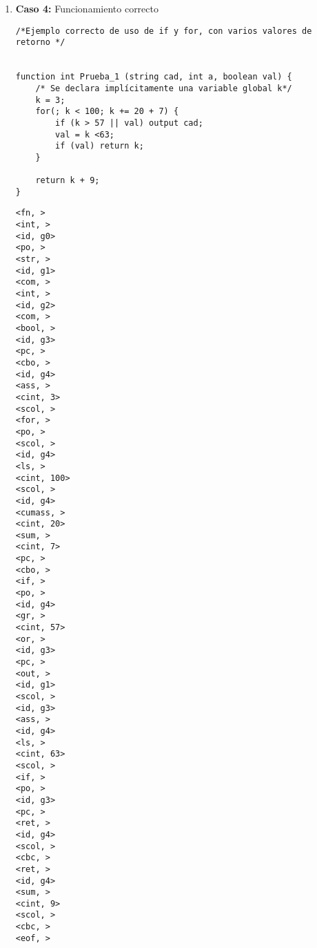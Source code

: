 \begin{enumerate}
\begin{tcolorbox}[title={Árbol sintáctico}, colback=white, breakable]
\begin{lstlisting}
                                              · COMPOP (45)
                                                · >
                                              · EXP4 (47)
                                                · EXPATOM (52)
                                                  · id
                                                  · IDVAL (59)
                                                    · lambda
                                                · ARITH (49)
                                                  · lambda
                                              · COMP (44)
                                                · lambda
                                          · EXPAND (41)
                                            · lambda
                                      · EXPOR (38)
                                        · lambda
                                    · )
                                  · ARITH (49)
                                    · lambda
                                · COMP (44)
                                  · lambda
                              · EXPAND (41)
                                · lambda
                            · EXPOR (38)
                              · lambda
                    · ;
                · P (3)
                  · eof
        \end{lstlisting}
    \end{tcolorbox}





    \item \textbf{Caso 4:} Funcionamiento correcto
    \begin{tcolorbox}[title={Código fuente}, colback=white]
        \begin{lstlisting}
/*Ejemplo correcto de uso de if y for, con varios valores de retorno */


function int Prueba_1 (string cad, int a, boolean val) {
	/* Se declara implícitamente una variable global k*/
	k = 3;
	for(; k < 100; k += 20 + 7) {
		if (k > 57 || val) output cad;
		val = k <63;
		if (val) return k;
	}

	return k + 9;
}
        \end{lstlisting}
    \end{tcolorbox}

    \begin{tcolorbox}[title={Volcado del fichero de tokens}, colback=white]
        \begin{lstlisting}
<fn, >
<int, >
<id, g0>
<po, >
<str, >
<id, g1>
<com, >
<int, >
<id, g2>
<com, >
<bool, >
<id, g3>
<pc, >
<cbo, >
<id, g4>
<ass, >
<cint, 3>
<scol, >
<for, >
<po, >
<scol, >
<id, g4>
<ls, >
<cint, 100>
<scol, >
<id, g4>
<cumass, >
<cint, 20>
<sum, >
<cint, 7>
<pc, >
<cbo, >
<if, >
<po, >
<id, g4>
<gr, >
<cint, 57>
<or, >
<id, g3>
<pc, >
<out, >
<id, g1>
<scol, >
<id, g3>
<ass, >
<id, g4>
<ls, >
<cint, 63>
<scol, >
<if, >
<po, >
<id, g3>
<pc, >
<ret, >
<id, g4>
<scol, >
<cbc, >
<ret, >
<id, g4>
<sum, >
<cint, 9>
<scol, >
<cbc, >
<eof, >
        \end{lstlisting}
    \end{tcolorbox}


\end{enumerate}
